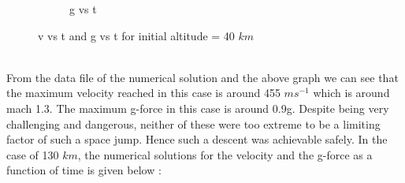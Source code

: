 \documentclass[a4paper, 14pt]{extarticle}
\begin{document}
\begin{figure}[ht]
\begin{subfigure}{0.5\textwidth}
    \caption{g vs t}
  \end{subfigure}
  \caption{v vs t and g vs t for initial altitude = 40 $km$}
\end{figure}\\
From the data file of the numerical solution and the above graph we can see that the maximum velocity reached in this case is around 455 $ms^{-1}$ which is around mach 1.3. The maximum g-force in this case is around 0.9g. Despite being very challenging and dangerous, neither of these were too extreme to be a limiting factor of such a space jump. Hence such a descent was achievable safely. In the case of 130 $km$, the numerical solutions for the velocity and the g-force as a function of time is given below :
\newpage
\end{document}
